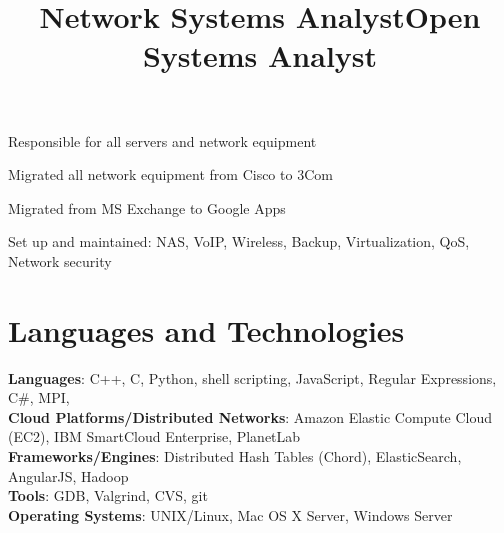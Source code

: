 \documentclass[margin,line]{resume}
\begin{document}
\begin{resume}
    \newpage    
    \title{\textbf{Network Systems Analyst}}
    \begin{position}
    \vspace{-2mm}
    \begin{list2}
    \item Responsible for all servers and network equipment
    \item Migrated all network equipment from Cisco to 3Com
    \item Migrated from MS Exchange to Google Apps
    \item Set up and maintained: NAS, VoIP, Wireless, Backup, Virtualization, QoS, Network security
    \end{list2}
    \end{position}

    \title{\textbf{Open Systems Analyst}}

    \begin{position}
    \vspace{-2mm}
    \end{position}

    \section{\mysidestyle Languages and Technologies} 

    \textbf{Languages}: C++, C, Python, shell scripting, JavaScript, Regular Expressions, C\#, MPI, \LaTeXe\\
    \textbf{Cloud Platforms/Distributed Networks}: Amazon Elastic Compute Cloud (EC2), IBM SmartCloud Enterprise, PlanetLab\\
    \textbf{Frameworks/Engines}: Distributed Hash Tables (Chord), ElasticSearch, AngularJS, Hadoop\\
    \textbf{Tools}: GDB, Valgrind, CVS, git\\
    \textbf{Operating Systems}: {\sc UNIX}/Linux, Mac OS X Server, Windows Server
    

\end{resume}
\end{document}
